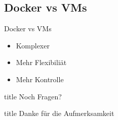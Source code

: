 \documentclass[14pt]{beamer}
\begin{document}
   	\subsection{Docker vs VMs}
    \begin{frame}{Docker vs VMs}
    \begin{itemize}
    \item Komplexer
    \item Mehr Flexibiliät
    \item Mehr Kontrolle
    \end{itemize}
    \end{frame}
   
    \begin{frame}
      \vfill
      \centering
      \begin{beamercolorbox}[sep=8pt,center,shadow=true,rounded=true]{title}
        Noch Fragen?
      \end{beamercolorbox}
      \vfill
    \end{frame}
  
    \begin{frame}
      \vfill
      \centering
      \begin{beamercolorbox}[sep=8pt,center,shadow=true,rounded=true]{title}
        Danke für die Aufmerksamkeit
      \end{beamercolorbox}
      \vfill
    \end{frame}
  
\end{document}
